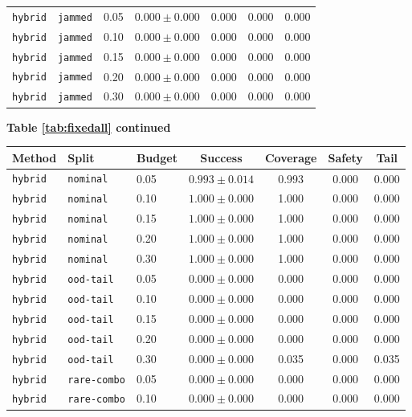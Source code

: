 \documentclass{article}
\begin{document}
\begin{center}
\begin{tabular}{lllcccc}
\texttt{hybrid} & \texttt{jammed} & 0.05 & $0.000 \pm 0.000$ & 0.000 & 0.000 & 0.000 \\
\texttt{hybrid} & \texttt{jammed} & 0.10 & $0.000 \pm 0.000$ & 0.000 & 0.000 & 0.000 \\
\texttt{hybrid} & \texttt{jammed} & 0.15 & $0.000 \pm 0.000$ & 0.000 & 0.000 & 0.000 \\
\texttt{hybrid} & \texttt{jammed} & 0.20 & $0.000 \pm 0.000$ & 0.000 & 0.000 & 0.000 \\
\texttt{hybrid} & \texttt{jammed} & 0.30 & $0.000 \pm 0.000$ & 0.000 & 0.000 & 0.000 \\
\bottomrule
\end{tabular}
\end{center}
\begin{center}
\textbf{Table \ref{tab:fixedall} continued}\\[0.4ex]
\begin{tabular}{lllcccc}
\toprule
Method & Split & Budget & Success & Coverage & Safety & Tail \\
\midrule
\texttt{hybrid} & \texttt{nominal} & 0.05 & $0.993 \pm 0.014$ & 0.993 & 0.000 & 0.000 \\
\texttt{hybrid} & \texttt{nominal} & 0.10 & $1.000 \pm 0.000$ & 1.000 & 0.000 & 0.000 \\
\texttt{hybrid} & \texttt{nominal} & 0.15 & $1.000 \pm 0.000$ & 1.000 & 0.000 & 0.000 \\
\texttt{hybrid} & \texttt{nominal} & 0.20 & $1.000 \pm 0.000$ & 1.000 & 0.000 & 0.000 \\
\texttt{hybrid} & \texttt{nominal} & 0.30 & $1.000 \pm 0.000$ & 1.000 & 0.000 & 0.000 \\
\texttt{hybrid} & \texttt{ood-tail} & 0.05 & $0.000 \pm 0.000$ & 0.000 & 0.000 & 0.000 \\
\texttt{hybrid} & \texttt{ood-tail} & 0.10 & $0.000 \pm 0.000$ & 0.000 & 0.000 & 0.000 \\
\texttt{hybrid} & \texttt{ood-tail} & 0.15 & $0.000 \pm 0.000$ & 0.000 & 0.000 & 0.000 \\
\texttt{hybrid} & \texttt{ood-tail} & 0.20 & $0.000 \pm 0.000$ & 0.000 & 0.000 & 0.000 \\
\texttt{hybrid} & \texttt{ood-tail} & 0.30 & $0.000 \pm 0.000$ & 0.035 & 0.000 & 0.035 \\
\texttt{hybrid} & \texttt{rare-combo} & 0.05 & $0.000 \pm 0.000$ & 0.000 & 0.000 & 0.000 \\
\texttt{hybrid} & \texttt{rare-combo} & 0.10 & $0.000 \pm 0.000$ & 0.000 & 0.000 & 0.000 \\

\end{tabular}
\end{center}
\end{document}
